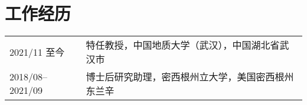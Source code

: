 \section{工作经历}

\begin{tabular}{p{} p{}}
2021/11 至今 & 特任教授，中国地质大学（武汉），中国湖北省武汉市 \\
2018/08--2021/09 & 博士后研究助理，密西根州立大学，美国密西根州东兰辛 \\
\end{tabular}
